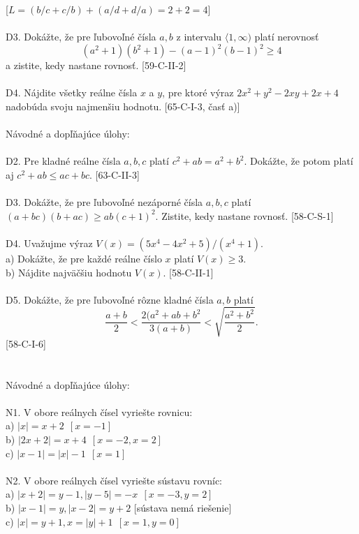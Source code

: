{[$L = (b/c + c/b) + (a/d + d/a) = 2 + 2 = 4$]}\\
\\
D3. Dokážte, že pre ľubovoľné čísla $a, b$ z intervalu $\langle 1, \infty)$ platí nerovnosť
$$(a^2+1)(b^2+1)-(a-1)^2(b-1)^2\geq4 $$
a zistite, kedy nastane rovnosť. {[59-C-II-2]}\\
\\
D4. Nájdite všetky reálne čísla $x$ a $y$, pre ktoré výraz $2x^2+ y^2 - 2xy + 2x + 4$ nadobúda
svoju najmenšiu hodnotu. {[65-C-I-3, časť a)]}\\
\\
Návodné a dopľňajúce úlohy:\\
\\
D2. Pre kladné reálne čísla $a, b, c$ platí $c^2+ ab = a^2+ b^2$. Dokážte, že potom platí aj $c^2+ ab \leq ac + bc$. [63-C-II-3]\\
\\
D3. Dokážte, že pre ľubovoľné nezáporné čísla $a, b, c$ platí $(a + bc)(b + ac) \geq ab(c + 1)^2$. Zistite, kedy nastane rovnosť. [58-C-S-1]\\
\\
D4. Uvažujme výraz $V (x) = (5x^4 - 4x^2+ 5)/(x^4+ 1)$.\\
a) Dokážte, že pre každé reálne číslo $x$ platí $V (x) \geq 3$.\\
b) Nájdite najväčšiu hodnotu $V (x)$. [58-C-II-1]\\
\\
D5. Dokážte, že pre ľubovoľné rôzne kladné čísla $a, b$ platí $$\frac{a+b}{2}<\frac{2(a^2+ab+b^2}{3(a+b)}<\sqrt{\frac{a^2+b^2}{2}}.$$
[58-C-I-6]\\
\\

\\
Návodné a dopľňajúce úlohy:\\
\\
N1. V obore reálnych čísel vyriešte rovnicu:\\
a) $|x| = x + 2 \ \ [x = -1]$\\
b) $|2x + 2| = x + 4 \ \ [x = -2, x = 2]$\\
c) $|x - 1| = |x| - 1 \ \ [x = 1]$\\
\\
N2. V obore reálnych čísel vyriešte sústavu rovníc:\\
a) $|x + 2| = y - 1, |y - 5| = -x \ \ [x = -3, y = 2]$\\
b) $|x - 1| = y, |x - 2| = y + 2$  [sústava nemá riešenie]\\
c) $|x| = y + 1, x = |y| + 1 \ \ [x = 1, y = 0]$\\
\\


